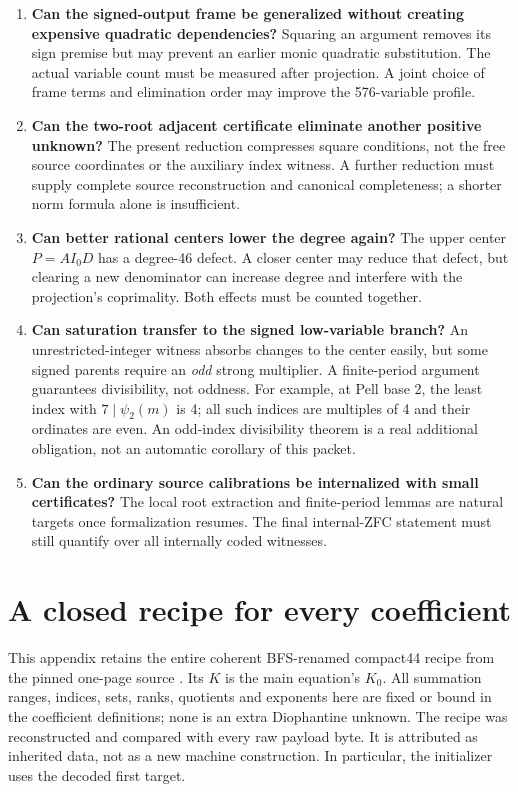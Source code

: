 \documentclass[11pt]{article}
\theoremstyle{remark}\newtheorem{remark}[theorem]{Remark}
\begin{document}
\begin{enumerate}
\item \textbf{Can the signed-output frame be generalized without creating
expensive quadratic dependencies?} Squaring an argument removes its sign
premise but may prevent an earlier monic quadratic substitution. The actual
variable count must be measured after projection. A joint choice of frame
terms and elimination order may improve the 576-variable profile.
\item \textbf{Can the two-root adjacent certificate eliminate another
positive unknown?} The present reduction compresses square conditions, not
the free source coordinates or the auxiliary index witness. A further
reduction must supply complete source reconstruction and canonical
completeness; a shorter norm formula alone is insufficient.
\item \textbf{Can better rational centers lower the degree again?} The
upper center $P=AI_0D$ has a degree-46 defect. A closer center may reduce that
defect, but clearing a new denominator can increase degree and interfere
with the projection's coprimality. Both effects must be counted together.
\item \textbf{Can saturation transfer to the signed low-variable branch?}
An unrestricted-integer witness absorbs changes to the center easily, but
some signed parents require an \emph{odd} strong multiplier. A finite-period
argument guarantees divisibility, not oddness. For example, at Pell base 2,
the least index with $7\mid\psi_2(m)$ is 4; all such indices are multiples
of 4 and their ordinates are even. An odd-index divisibility theorem is a
real additional obligation, not an automatic corollary of this packet.
\item \textbf{Can the ordinary source calibrations be internalized with
small certificates?} The local root extraction and finite-period lemmas
are natural targets once formalization resumes. The final internal-ZFC
statement must still quantify over all internally coded witnesses.
\end{enumerate}

\appendix
\section{A closed recipe for every coefficient}
\label{app:constants}

This appendix retains the entire coherent BFS-renamed compact44 recipe from
the pinned one-page source \cite{bfspage}. Its $K$ is the main equation's
$K_0$. All summation ranges, indices, sets, ranks, quotients and exponents
here are fixed or bound in the coefficient definitions; none is an extra
Diophantine unknown. The recipe was reconstructed and compared with every
raw payload byte. It is attributed as inherited data, not as a new machine
construction. In particular, the initializer uses the decoded first target.
\end{document}
